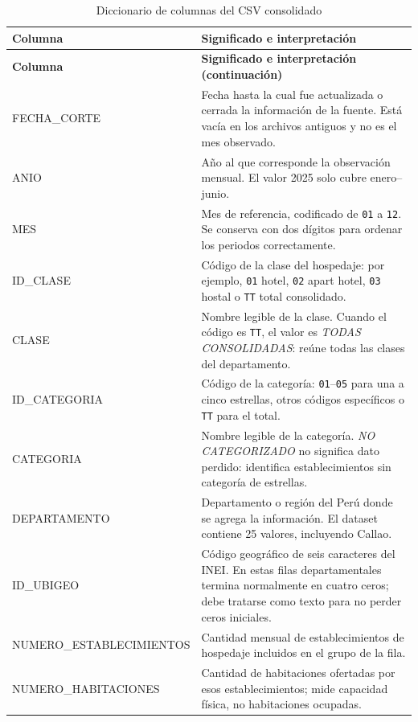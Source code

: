 \documentclass[10pt,a4paper]{article}
\theoremstyle{definition}
\begin{document}
\small
\begin{longtable}{>{\ttfamily\raggedright\arraybackslash}p{}
                  >{\raggedright\arraybackslash}p{}}
\caption{Diccionario de columnas del CSV consolidado}\label{tab:diccionario-columnas}\\
\toprule
\normalfont\textbf{Columna} & \textbf{Significado e interpretación} \\
\midrule
\endfirsthead
\toprule
\normalfont\textbf{Columna} & \textbf{Significado e interpretación (continuación)} \\
\midrule
\endhead
\bottomrule
\endfoot
FECHA\_CORTE & Fecha hasta la cual fue actualizada o cerrada la información de
la fuente. Está vacía en los archivos antiguos y no es el mes observado. \\
ANIO & Año al que corresponde la observación mensual. El valor 2025 solo cubre
enero--junio. \\
MES & Mes de referencia, codificado de \texttt{01} a \texttt{12}. Se conserva
con dos dígitos para ordenar los periodos correctamente. \\
ID\_CLASE & Código de la clase del hospedaje: por ejemplo, \texttt{01} hotel,
\texttt{02} apart hotel, \texttt{03} hostal o \texttt{TT} total consolidado. \\
CLASE & Nombre legible de la clase. Cuando el código es \texttt{TT}, el valor
es \emph{TODAS CONSOLIDADAS}: reúne todas las clases del departamento. \\
ID\_CATEGORIA & Código de la categoría: \texttt{01}--\texttt{05} para una a
cinco estrellas, otros códigos específicos o \texttt{TT} para el total. \\
CATEGORIA & Nombre legible de la categoría. \emph{NO CATEGORIZADO} no significa
dato perdido: identifica establecimientos sin categoría de estrellas. \\
DEPARTAMENTO & Departamento o región del Perú donde se agrega la información.
El dataset contiene 25 valores, incluyendo Callao. \\
ID\_UBIGEO & Código geográfico de seis caracteres del INEI. En estas filas
departamentales termina normalmente en cuatro ceros; debe tratarse como texto
para no perder ceros iniciales. \\
NUMERO\_ESTABLECIMIENTOS & Cantidad mensual de establecimientos de hospedaje
incluidos en el grupo de la fila. \\
NUMERO\_HABITACIONES & Cantidad de habitaciones ofertadas por esos
establecimientos; mide capacidad física, no habitaciones ocupadas. \\

\end{longtable}
\end{document}
